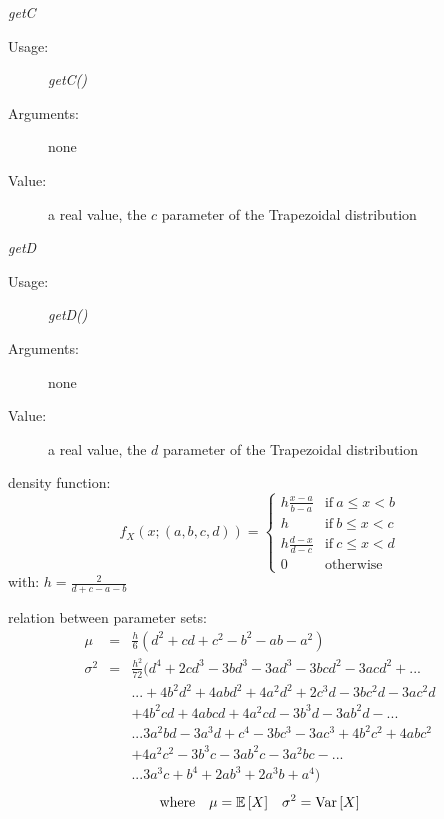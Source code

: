 \begin{description}
\begin{description}
\item \textit{getC}
\begin{description}
\item[Usage:] \textit{getC()}
\item[Arguments:] none
\item[Value:]  a real value,  the $c$ parameter of the Trapezoidal distribution
\end{description}

\item \textit{getD}
\begin{description}
\item[Usage:] \textit{getD()}
\item[Arguments:] none
\item[Value:]  a real value,  the $d$ parameter of the Trapezoidal distribution
\end{description}

\end{description}

\item[Details:]  \rule{0pt}{1em}
\begin{description}
\item density function:
\begin{equation}
f_X(x;(a,b,c,d)) = \left\{
\begin{array}{ll}
\displaystyle h \frac {x-a}{b-a} & \textrm{if}\ a\leq x < b \\
\displaystyle h & \textrm{if}\ b\leq x < c \\
\displaystyle  h \frac{d-x}{d-c}& \textrm{if}\ c\leq x < d \\
0 & \textrm{otherwise}
\end{array}
\right.
\end{equation}
with:
$h=\frac{2}{d+c-a-b}$

\item relation between parameter sets:
\begin{eqnarray*}
\mu           &   = &   \frac{h}{6}(d^2 + cd + c^2 - b^2 - ab - a^2)  \\
\sigma^2        &  =  &  \frac{h^2}{72}(d^4 + 2cd^3 - 3bd^3 - 3ad^3 - 3bcd^2 - 3acd^2 + ...\\
& & ... + 4b^2d^2 + 4abd^2 + 4a^2d^2 + 2c^3d - 3bc^2d - 3ac^2d   \\
& & + 4b^2cd + 4abcd + 4a^2cd - 3b^3d - 3ab^2d - ...\\
& & ... 3a^2bd - 3a^3d + c^4 - 3bc^3 - 3ac^3 +4b^2c^2 + 4abc^2   \\
& & + 4a^2c^2 - 3b^3c - 3ab^2c - 3a^2bc - ...\\
& & ... 3a^3c + b^4 + 2ab^3 + 2a^3b + a^4)
\end{eqnarray*}
\begin{align*}
\mbox{where}
&&
\mu = {\mathbb E}\left[ X \right]
&&
\sigma^2 = {\rm Var}\left[ X \right]
\end{align*}
\end{description}
\bigskip

\item[Links:]  \rule{0pt}{1em}
\end{description}


